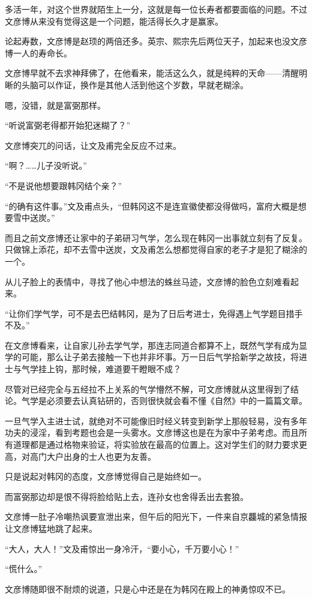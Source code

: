 多活一年，对这个世界就陌生上一分，这就是每一位长寿者都要面临的问题。不过文彦博从来没有觉得这是一个问题，能活得长久才是赢家。

论起寿数，文彦博是赵顼的两倍还多。英宗、熙宗先后两位天子，加起来也没文彦博一人的寿命长。

文彦博早就不去求神拜佛了，在他看来，能活这么久，就是纯粹的天命——清醒明晰的头脑可以作证，换作是其他人活到他这个岁数，早就老糊涂。

嗯，没错，就是富弼那样。

“听说富弼老得都开始犯迷糊了？”

文彦博突兀的问话，让文及甫完全反应不过来。

“啊？……儿子没听说。”

“不是说他想要跟韩冈结个亲？”

“的确有这件事。”文及甫点头，“但韩冈这不是连宣徽使都没得做吗，富府大概是想要雪中送炭。”

而且之前文彦博还让家中的子弟研习气学，怎么现在韩冈一出事就立刻有了反复。只做锦上添花，却不去雪中送炭，文及甫怎么想都觉得自家的老子才是犯了糊涂的一个。

从儿子脸上的表情中，寻找了他心中想法的蛛丝马迹，文彦博的脸色立刻难看起来。

“让你们学气学，可不是去巴结韩冈，是为了日后考进士，免得遇上气学题目措手不及。”

在文彦博看来，让自家儿孙去学气学，那连志同道合都算不上，既然气学有成为显学的可能，那么让子弟去接触一下也并非坏事。万一日后气学拾新学之故技，将进士与气学挂上钩，那时候，难道要干瞪眼不成？

尽管对已经完全与五经拉不上关系的气学懵然不解，可文彦博就从这里得到了结论。气学是必须要去认真钻研的，否则很快就会看不懂《自然》中的一篇篇文章。

一旦气学入主进士试，就绝对不可能像旧时经义转变到新学上那般轻易，没有多年功夫的浸淫，看到考题也会是一头雾水。文彦博这也是在为家中子弟考虑。而且所有道理都是通过格物来验证，将实验放在最高的位置上。这对学生们的财力要求更高，对高门大户出身的士人也更为友善。

只是说起对韩冈的态度，文彦博觉得自己是始终如一。

而富弼那边却是恨不得将脸给贴上去，连孙女也舍得丢出去套狼。

文彦博一肚子冷嘲热讽要宣泄出来，但午后的阳光下，一件来自京龘城的紧急情报让文彦博猛地跳了起来。

“大人，大人！”文及甫惊出一身冷汗，“要小心，千万要小心！”

“慌什么。”

文彦博随即很不耐烦的说道，只是心中还是在为韩冈在殿上的神勇惊叹不已。

